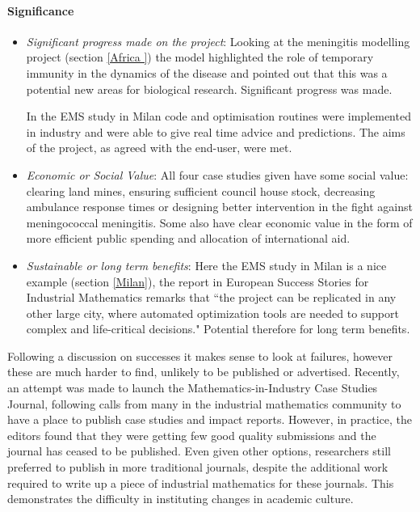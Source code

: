 \documentclass[11pt]{article} %
\begin{document}
\paragraph{Significance}
\begin{itemize}
	\item \textit{Significant progress made on the project}: Looking at the meningitis modelling project (section \ref{Africa }) the model highlighted the role of temporary immunity in the dynamics of the disease and pointed out that this was a   potential new areas for biological research. Significant progress was made. 
	
	In the EMS study in Milan code and optimisation routines were implemented in industry and were able to give real time advice and predictions. The aims of the project, as agreed with the end-user, were met. 
	
	\item \textit{Economic or Social Value}: All four case studies given have some social value: clearing land mines, ensuring sufficient council house stock, decreasing ambulance response times or designing better intervention in the fight against meningococcal meningitis. Some also have clear economic value in the form of more efficient public spending and allocation of international aid.
	\item \textit{Sustainable or long term benefits}: Here the EMS study in Milan is a nice example (section \ref{Milan}), the report in European Success Stories for Industrial Mathematics \cite{European2011}  remarks that ``the project can be replicated in any other large city, where automated optimization tools are needed to support complex and life-critical decisions." Potential therefore for long term benefits.
\end{itemize}



	Following a discussion on successes it makes sense to look at failures, however these are much harder to find, unlikely to be published or advertised. Recently, an  attempt was made to launch the   Mathematics-in-Industry Case Studies Journal,  following calls from many in the industrial mathematics community to have a place to publish case studies and impact reports. However, in practice, the editors found that they were getting few good quality submissions and the journal has ceased to be published. Even given other options, researchers still preferred to publish in more traditional journals, despite the additional work required to write up a piece of industrial mathematics for these journals. This demonstrates the difficulty in instituting changes in academic culture.  
	
\end{document}
